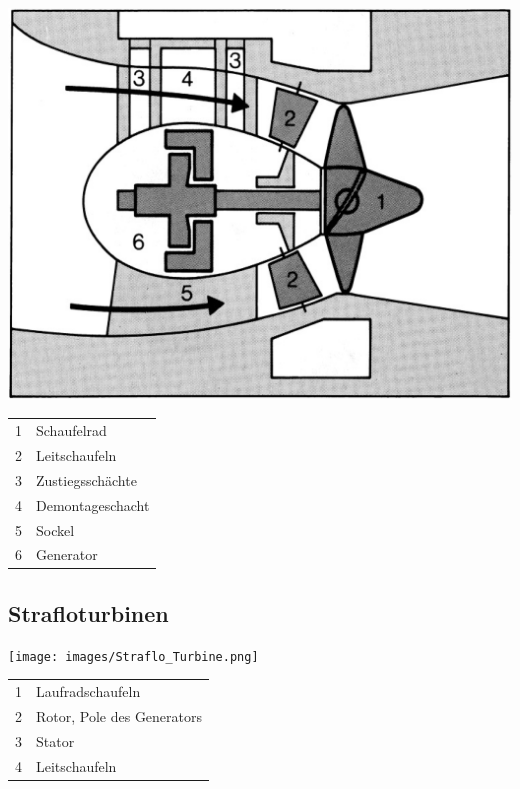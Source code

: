 \begin{minipage}[c]{0.48\columnwidth}
    \includegraphics[width=0.98\columnwidth, align=c]{images/Rohr_Turbinen.png}    
\end{minipage}
\hfill
\begin{minipage}[t]{0.48\columnwidth}
    \begin{tabular}{c l}
        1 & Schaufelrad \\
        2 & Leitschaufeln \\
        3 & Zustiegsschächte \\
        4 & Demontageschacht \\
        5 & Sockel \\
        6 & Generator \\
\end{tabular}  
\end{minipage}



\subsection{Strafloturbinen}
\begin{minipage}[c]{0.48\columnwidth}
    \texttt{[image: images/Straflo\_Turbine.png]}    
\end{minipage}
\hfill
\begin{minipage}[t]{0.48\columnwidth}
    \begin{tabular}{c l}
        1 & Laufradschaufeln \\
        2 & Rotor, Pole des Generators \\
        3 & Stator \\
        4 & Leitschaufeln \\
\end{tabular}  
\end{minipage}


